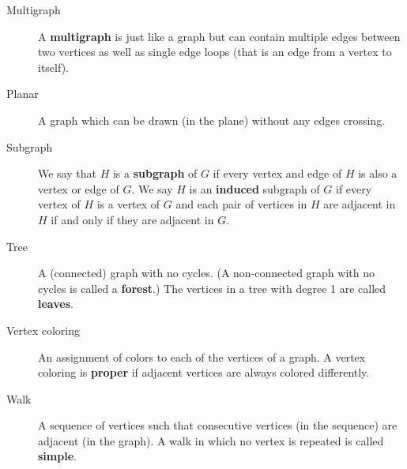 \documentclass[10pt,]{book}
\newcommand{\terminology}[1]{\textbf{#1}}
\theoremstyle{plain}
\theoremstyle{definition}
\theoremstyle{definition}
\theoremstyle{definition}
\theoremstyle{definition}
\numberwithin{equation}{chapter}
\begin{document}
\begin{assemblage}
\begin{description}
\item[{Multigraph}]\hypertarget{li-700}{}\hypertarget{p-1546}{}%
 A \terminology{multigraph} is just like a graph but can contain multiple edges between two vertices as well as single edge loops (that is an edge from a vertex to itself).%
\item[{Planar}]\hypertarget{li-701}{}\hypertarget{p-1547}{}%
 A graph which can be drawn (in the plane) without any edges crossing.%
\item[{Subgraph}]\hypertarget{li-702}{}\hypertarget{p-1548}{}%
 We say that \(H\) is a \terminology{subgraph} of \(G\) if every vertex and edge of \(H\) is also a vertex or edge of \(G\). We say \(H\) is an \terminology{induced} subgraph of \(G\) if every vertex of \(H\) is a vertex of \(G\) and each pair of vertices in \(H\) are adjacent in \(H\) if and only if they are adjacent in \(G\).%
\item[{Tree}]\hypertarget{li-703}{}\hypertarget{p-1549}{}%
 A (connected) graph with no cycles. (A non-connected graph with no cycles is called a \terminology{forest}.) The vertices in a tree with degree 1 are called \terminology{leaves}.%
\item[{Vertex coloring}]\hypertarget{li-704}{}\hypertarget{p-1550}{}%
 An assignment of colors to each of the vertices of a graph. A vertex coloring is \terminology{proper} if adjacent vertices are always colored differently.%
\item[{Walk}]\hypertarget{li-705}{}\hypertarget{p-1551}{}%
 A sequence of vertices such that consecutive vertices (in the sequence) are adjacent (in the graph). A walk in which no vertex is repeated is called \terminology{simple}.%
\end{description}
%
\end{assemblage}
\typeout{************************************************}
\typeout{************************************************}
\end{document}
